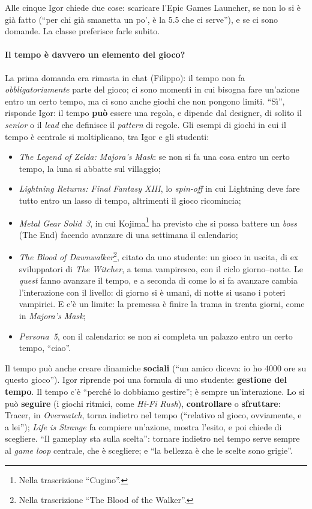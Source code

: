 Alle cinque Igor chiede due cose: scaricare l'Epic Games Launcher, se non lo si è già
fatto (``per chi già smanetta un po', è la 5.5 che ci serve''), e se ci sono domande. La
classe preferisce farle subito.

\paragraph{Il tempo è davvero un elemento del gioco?} La prima domanda era rimasta in
chat (Filippo): il tempo non fa \emph{obbligatoriamente} parte del gioco; ci sono momenti
in cui bisogna fare un'azione entro un certo tempo, ma ci sono anche giochi che non
pongono limiti. ``Sì'', risponde Igor: il tempo \textbf{può} essere una regola, e
dipende dal designer, di solito il \emph{senior} o il \emph{lead} che definisce il
\emph{pattern} di regole. Gli esempi di giochi in cui il tempo è centrale si
moltiplicano, tra Igor e gli studenti:
\begin{itemize}
  \item \emph{The Legend of Zelda: Majora's Mask}: se non si fa una cosa entro un certo
        tempo, la luna si abbatte sul villaggio;
  \item \emph{Lightning Returns: Final Fantasy XIII}, lo \emph{spin-off} in cui
        Lightning deve fare tutto entro un lasso di tempo, altrimenti il gioco
        ricomincia;
  \item \emph{Metal Gear Solid~3}, in cui Kojima\footnote{Nella trascrizione
        ``Cugino''.} ha previsto che si possa battere un \emph{boss} (The End) facendo
        avanzare di una settimana il calendario;
  \item \emph{The Blood of Dawnwalker}\footnote{Nella trascrizione ``The Blood of the
        Walker''.}, citato da uno studente: un gioco in uscita, di ex sviluppatori di
        \emph{The Witcher}, a tema vampiresco, con il ciclo giorno--notte. Le
        \emph{quest} fanno avanzare il tempo, e a seconda di come lo si fa avanzare
        cambia l'interazione con il livello: di giorno si è umani, di notte si usano i
        poteri vampirici. E c'è un limite: la premessa è finire la trama in trenta
        giorni, come in \emph{Majora's Mask};
  \item \emph{Persona~5}, con il calendario: se non si completa un palazzo entro un
        certo tempo, ``ciao''.
\end{itemize}
Il tempo può anche creare dinamiche \textbf{sociali} (``un amico diceva: io ho 4000 ore
su questo gioco''). Igor riprende poi una formula di uno studente: \textbf{gestione del
tempo}. Il tempo c'è ``perché lo dobbiamo gestire''; è sempre un'interazione. Lo si può
\textbf{seguire} (i giochi ritmici, come \emph{Hi-Fi Rush}), \textbf{controllare} o
\textbf{sfruttare}: Tracer, in \emph{Overwatch}, torna indietro nel tempo (``relativo al
gioco, ovviamente, e a lei''); \emph{Life is Strange} fa compiere un'azione, mostra
l'esito, e poi chiede di scegliere. ``Il gameplay sta sulla scelta'': tornare indietro
nel tempo serve sempre al \emph{game loop} centrale, che è scegliere; e ``la bellezza è
che le scelte sono grigie''.

